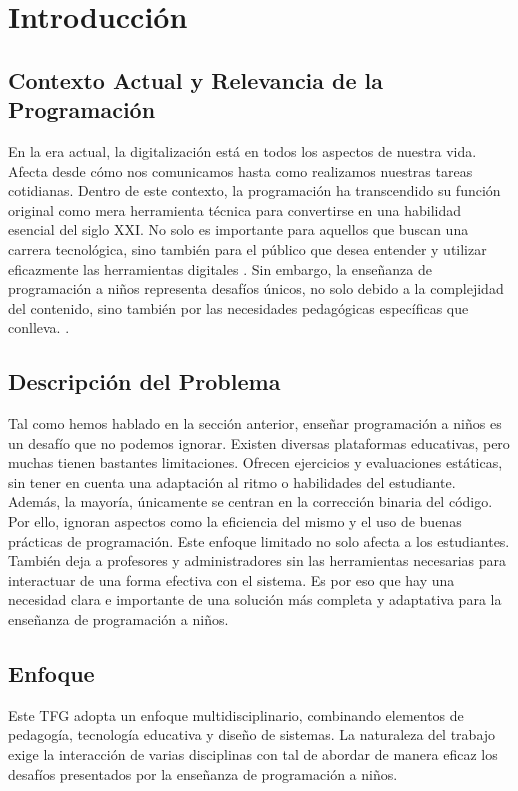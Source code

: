 \chapter{Introducción} \label{chap:introduction}

\section{Contexto Actual y Relevancia de la Programación}
En la era actual, la digitalización está en todos los aspectos de nuestra vida. Afecta desde cómo nos comunicamos hasta como realizamos nuestras tareas cotidianas. Dentro de este contexto, la programación ha transcendido su función original como mera herramienta técnica para convertirse en una habilidad esencial del siglo XXI. No solo es importante para aquellos que buscan una carrera tecnológica, sino también para el público que desea entender y utilizar eficazmente las herramientas digitales \cite{hadi_partovi}. Sin embargo, la enseñanza de programación a niños representa desafíos únicos, no solo debido a la complejidad del contenido, sino también por las necesidades pedagógicas específicas que conlleva. \cite{liukas_tedxcern}.

\section{Descripción del Problema}

Tal como hemos hablado en la sección anterior, enseñar programación a niños es un desafío que no podemos ignorar. Existen diversas plataformas educativas, pero muchas tienen bastantes limitaciones. Ofrecen ejercicios y evaluaciones estáticas, sin tener en cuenta una adaptación al ritmo o habilidades del estudiante. Además, la mayoría, únicamente se centran en la corrección binaria del código. Por ello, ignoran aspectos como la eficiencia del mismo y el uso de buenas prácticas de programación. Este enfoque limitado no solo afecta a los estudiantes. También deja a profesores y administradores sin las herramientas necesarias para interactuar de una forma efectiva con el sistema. Es por eso que hay una necesidad clara e importante de una solución más completa y adaptativa para la enseñanza de programación a niños.

\section{Enfoque}
Este TFG adopta un enfoque multidisciplinario, combinando elementos de pedagogía, tecnología educativa y diseño de sistemas. La naturaleza del trabajo exige la interacción de varias disciplinas con tal de abordar de manera eficaz los desafíos presentados por la enseñanza de programación a niños.

